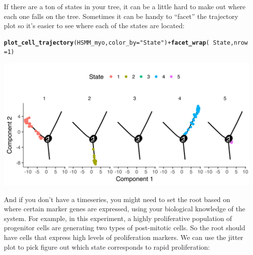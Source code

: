 \documentclass[10pt,oneside]{article}\usepackage[]{graphicx}\usepackage[]{color}
\makeatletter
\def\maxwidth{ %
  \ifdim\Gin@nat@width>\linewidth
    \linewidth
  \else
    \Gin@nat@width
  \fi
}
\newcommand{\hlnum}[1]{\textcolor[rgb]{0.686,0.059,0.569}{#1}}%
\newcommand{\hlstr}[1]{\textcolor[rgb]{0.192,0.494,0.8}{#1}}%
\newcommand{\hlopt}[1]{\textcolor[rgb]{0,0,0}{#1}}%
\newcommand{\hlstd}[1]{\textcolor[rgb]{0.345,0.345,0.345}{#1}}%
\newcommand{\hlkwc}[1]{\textcolor[rgb]{0.333,0.667,0.333}{#1}}%
\newcommand{\hlkwd}[1]{\textcolor[rgb]{0.737,0.353,0.396}{\textbf{#1}}}%
\newenvironment{kframe}{%
 \def\at@end@of@kframe{}%
 \ifinner\ifhmode%
  \def\at@end@of@kframe{\end{minipage}}%
  \begin{minipage}{\columnwidth}%
 \fi\fi%
 \def\FrameCommand##1{\hskip\@totalleftmargin \hskip-\fboxsep
 \colorbox{shadecolor}{##1}\hskip-\fboxsep
     \hskip-\linewidth \hskip-\@totalleftmargin \hskip\columnwidth}%
 \MakeFramed {\advance\hsize-\width
   \@totalleftmargin\z@ \linewidth\hsize
   \@setminipage}}%
 {\par\unskip\endMakeFramed%
 \at@end@of@kframe}
\newenvironment{knitrout}{}{} %
\makeatother
\begin{document}
If there are a ton of states in your tree, it can be a little hard to make out where each one falls on the tree.  Sometimes it can be handy to ``facet'' the trajectory plot so it's easier to see where each of the states are located:

\begin{knitrout}
\color{fgcolor}\begin{kframe}
\begin{alltt}
\hlkwd{plot_cell_trajectory}\hlstd{(HSMM_myo,} \hlkwc{color_by}\hlstd{=}\hlstr{"State"}\hlstd{)} \hlopt{+} \hlkwd{facet_wrap}\hlstd{(}\hlopt{~}\hlstd{State,} \hlkwc{nrow}\hlstd{=}\hlnum{1}\hlstd{)}
\end{alltt}
\end{kframe}
\includegraphics[width=\maxwidth]{figure/init_hsmm_facet_state-1} 

\end{knitrout}

And if you don't have a timeseries, you might need to set the root based on where certain marker genes are expressed, using your biological knowledge of the system. For example, in this experiment, a highly proliferative population of progenitor cells are generating two types of post-mitotic cells. So the root should have cells that express high levels of proliferation markers. We can use the jitter plot to pick figure out which state corresponds to rapid proliferation:
\end{document}
